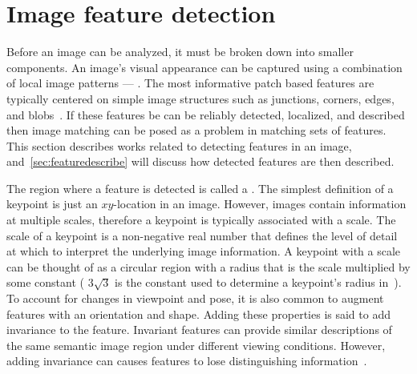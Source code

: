 \section{Image feature detection}\label{sec:featuredetect}

    Before an image can be analyzed, it must be broken down into
      smaller components.
    An image's visual appearance can be captured using a combination of
      local image patterns --- .
    The most informative patch based features are typically centered on
      simple image structures such as junctions, corners, edges, and
      blobs~\cite{tuytelaars_local_2007}.
    If these features be can be reliably detected, localized, and
      described then image matching can be posed as a problem in matching
      sets of features.
    This section describes works related to detecting features in an
      image, and~\cref{sec:featuredescribe} will discuss how detected
      features are then described.

    The region where a feature is detected is called a
      .
    The simplest definition of a keypoint is just an $xy$-location in
      an image.
    However, images contain information at multiple scales, therefore a
      keypoint is typically associated with a scale.
    The scale of a keypoint is a non-negative real number that defines
      the level of detail at which to interpret the underlying image
      information.
    A keypoint with a scale can be thought of as a circular region with
      a radius that is the scale multiplied by some constant (\eg{}
      $3\sqrt{3}$ is the constant used to determine a keypoint's radius
      in~\cite{perdoch_efficient_2009}).
    To account for changes in viewpoint and pose, it is also common to
      augment features with an orientation and shape.
    Adding these properties is said to add invariance to the feature.
    Invariant features can provide similar descriptions of the same
      semantic image region under different viewing conditions.
    However, adding invariance can causes features to lose
      distinguishing information~\cite{mikolajczyk_comparison_2005,
      tuytelaars_local_2007, perdoch_efficient_2009,
      lowe_distinctive_2004}.

